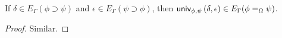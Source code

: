 \begin{lemma}
\label{lm:Euniv}
If $\delta \in E_\Gamma(\phi \supset \psi)$ and $\epsilon \in E_\Gamma(\psi \supset \phi)$, then $\mathsf{univ}_{{\phi} , {\psi}} \left( {\delta} , {\epsilon} \right) \in E_\Gamma(\phi =_\Omega \psi)$.
\end{lemma}

\begin{proof}
Similar.
\end{proof}


% 


% 
% 


% 
% 
% 


% 
% 
% 
% 
% 
% 
% 
% 
% 
% 


